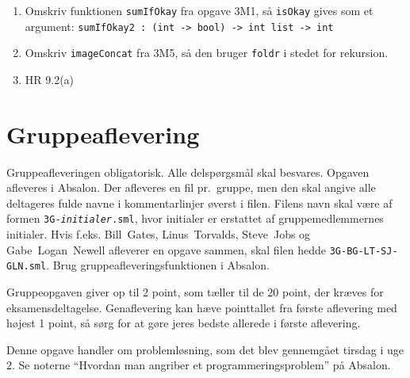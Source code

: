 \documentclass[a4paper,12pt]{article}
\begin{document}
\begin{enumerate}[{3}T1]
\item Omskriv funktionen \verb|sumIfOkay| fra opgave 3M1, så
  \verb|isOkay| gives som et argument:
  \verb|sumIfOkay2 : (int -> bool) -> int list -> int|

\item Omskriv \texttt{imageConcat} fra 3M5, så den bruger \verb|foldr| i
  stedet for rekursion.

\item HR 9.2(a)



\end{enumerate}

\newpage
\section{Gruppeaflevering}
\label{sec:gruppeaflevering}
Gruppeafleveringen obligatorisk.  Alle delspørgsmål skal besvares.
Opgaven afleveres i Absalon.  Der afleveres en fil pr.\ gruppe, men
den skal angive alle deltageres fulde navne i kommentarlinjer øverst i
filen. Filens navn skal være af formen
\texttt{3G-\textit{initialer}.sml}, hvor initialer er erstattet af
gruppemedlemmernes initialer. Hvis f.eks. Bill~Gates, Linus~Torvalds,
Steve~Jobs og Gabe~Logan~Newell afleverer en opgave sammen, skal filen
hedde \texttt{3G-BG-LT-SJ-GLN.sml}. Brug gruppeafleveringsfunktionen i
Absalon.

Gruppeopgaven giver op til 2 point, som tæller til de 20 point, der
kræves for eksamensdeltagelse.  Genaflevering kan hæve pointtallet fra
første aflevering med højest 1 point, så sørg for at gøre jeres bedste
allerede i første aflevering.

\vspace{1cm} Denne opgave handler om problemløsning, som det blev
gennemgået tirsdag i uge 2. Se noterne "`Hvordan man angriber et
programmeringsproblem"' på Absalon.
\end{document}
